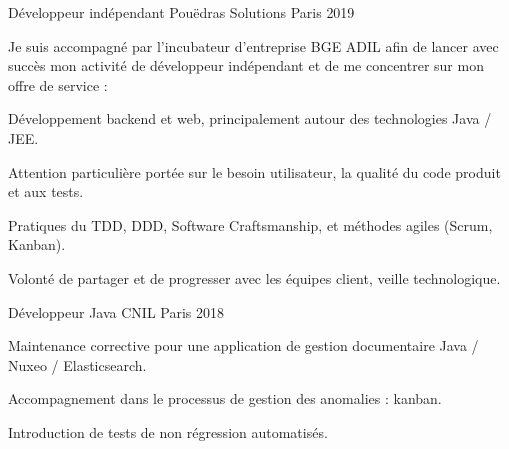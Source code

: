 

\begin{cventries}

  \cventry
    {Développeur indépendant} %
    {Pouëdras Solutions}
    {Paris} %
    {2019} %
    {
      \begin{cvitems} %
        \item {Je suis accompagné par l’incubateur d’entreprise BGE ADIL afin de lancer avec succès mon activité de développeur indépendant et de me concentrer sur mon offre de service : }
        \item {Développement backend et web, principalement autour des technologies Java / JEE.}
        \item {Attention particulière portée sur le besoin utilisateur, la qualité du code produit et aux tests.}
        \item {Pratiques du TDD, DDD, Software Craftsmanship, et méthodes agiles (Scrum, Kanban).}
        \item {Volonté de partager et de progresser avec les équipes client, veille technologique.}
      \end{cvitems}
    }

  \cventry
    {Développeur Java} %
    {CNIL} %
    {Paris} %
    {2018} %
    {
      \begin{cvitems} %
        \item {Maintenance corrective pour une application de gestion documentaire Java / Nuxeo / Elasticsearch.}
        \item {Accompagnement dans le processus de gestion des anomalies : kanban.}
        \item {Introduction de tests de non régression automatisés.}
      \end{cvitems}
    }


\end{cventries}
